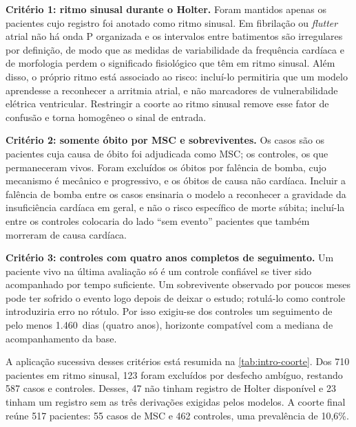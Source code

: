 \textbf{Critério 1: ritmo sinusal durante o Holter.} Foram mantidos apenas
os pacientes cujo registro foi anotado como ritmo sinusal. Em fibrilação ou
\textit{flutter} atrial não há onda P organizada e os intervalos entre
batimentos são irregulares por definição, de modo que as medidas de
variabilidade da frequência cardíaca e de morfologia perdem o significado
fisiológico que têm em ritmo sinusal. Além disso, o próprio ritmo está
associado ao risco: incluí-lo permitiria que um modelo aprendesse a
reconhecer a arritmia atrial, e não marcadores de vulnerabilidade elétrica
ventricular. Restringir a coorte ao ritmo sinusal remove esse fator de
confusão e torna homogêneo o sinal de entrada.

\textbf{Critério 2: somente óbito por \gls{MSC} e sobreviventes.} Os casos
são os pacientes cuja causa de óbito foi adjudicada como \gls{MSC}; os
controles, os que permaneceram vivos. Foram excluídos os óbitos por falência
de bomba, cujo mecanismo é mecânico e progressivo, e os óbitos de causa não
cardíaca. Incluir a falência de bomba entre os casos ensinaria o modelo a
reconhecer a gravidade da insuficiência cardíaca em geral, e não o risco
específico de morte súbita; incluí-la entre os controles colocaria do lado
``sem evento'' pacientes que também morreram de causa cardíaca.

\textbf{Critério 3: controles com quatro anos completos de seguimento.} Um
paciente vivo na última avaliação só é um controle confiável se tiver sido
acompanhado por tempo suficiente. Um sobrevivente observado por poucos
meses pode ter sofrido o evento logo depois de deixar o estudo; rotulá-lo
como controle introduziria erro no rótulo. Por isso exigiu-se dos controles
um seguimento de pelo menos 1.460~dias (quatro anos), horizonte compatível
com a mediana de acompanhamento da base.

A aplicação sucessiva desses critérios está resumida na
\autoref{tab:intro-coorte}. Dos 710 pacientes em ritmo sinusal, 123 foram
excluídos por desfecho ambíguo, restando 587 casos e controles. Desses, 47
não tinham registro de Holter disponível e 23 tinham um registro sem as três
derivações exigidas pelos modelos. A coorte final reúne 517 pacientes: 55
casos de \gls{MSC} e 462 controles, uma prevalência de 10,6\%.

